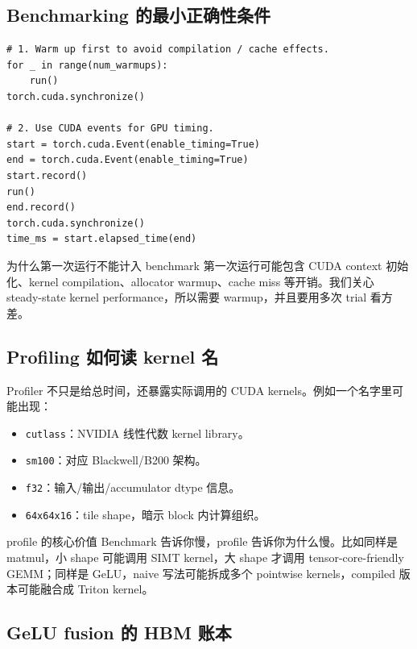 \documentclass[a4paper]{article}
\begin{document}
\subsection{Benchmarking 的最小正确性条件}

\begin{lstlisting}[caption={Benchmarking checklist}]
# 1. Warm up first to avoid compilation / cache effects.
for _ in range(num_warmups):
    run()
torch.cuda.synchronize()

# 2. Use CUDA events for GPU timing.
start = torch.cuda.Event(enable_timing=True)
end = torch.cuda.Event(enable_timing=True)
start.record()
run()
end.record()
torch.cuda.synchronize()
time_ms = start.elapsed_time(end)
\end{lstlisting}

\begin{knowledgebox}{为什么第一次运行不能计入 benchmark}
第一次运行可能包含 CUDA context 初始化、kernel compilation、allocator warmup、cache miss 等开销。我们关心 steady-state kernel performance，所以需要 warmup，并且要用多次 trial 看方差。
\end{knowledgebox}

\subsection{Profiling 如何读 kernel 名}

Profiler 不只是给总时间，还暴露实际调用的 CUDA kernels。例如一个名字里可能出现：

\begin{itemize}
    \item \texttt{cutlass}：NVIDIA 线性代数 kernel library。
    \item \texttt{sm100}：对应 Blackwell/B200 架构。
    \item \texttt{f32}：输入/输出/accumulator dtype 信息。
    \item \texttt{64x64x16}：tile shape，暗示 block 内计算组织。
\end{itemize}

\begin{importantbox}{profile 的核心价值}
Benchmark 告诉你慢，profile 告诉你为什么慢。比如同样是 matmul，小 shape 可能调用 SIMT kernel，大 shape 才调用 tensor-core-friendly GEMM；同样是 GeLU，naive 写法可能拆成多个 pointwise kernels，compiled 版本可能融合成 Triton kernel。
\end{importantbox}

\subsection{GeLU fusion 的 HBM 账本}
\end{document}
